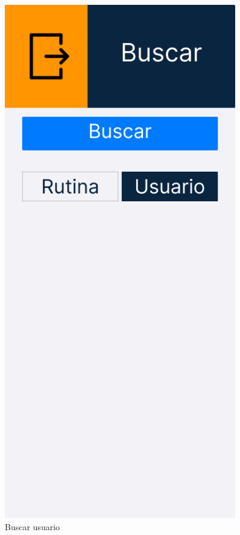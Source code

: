 \begin{figure}[H]
   \centering
   \begin{minipage}{0.45\textwidth}
      \centering
      \includegraphics[width=0.9\textwidth]{fotos/Frame 53.png}
      \caption{Buscar usuario}

\end{minipage}
\end{figure}
